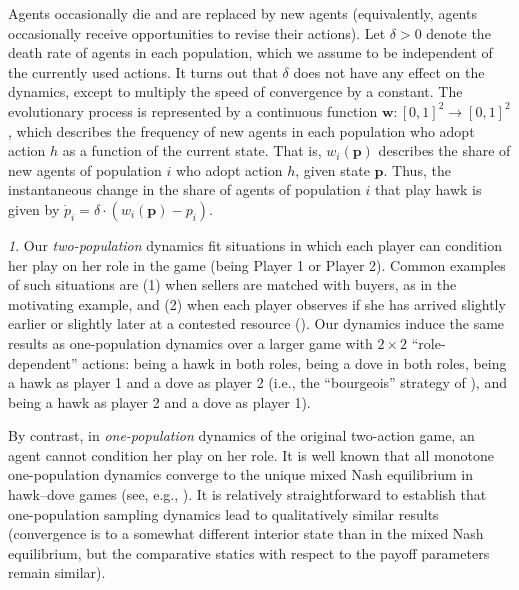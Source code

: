 \documentclass[12pt]{article}
\numberwithin{equation}{section}
\numberwithin{figure}{section}
\theoremstyle{definition}
\theoremstyle{plain}
\theoremstyle{plain}
\theoremstyle{plain}
\theoremstyle{remark}
\newtheorem{rem}{\protect\remarkname}
\theoremstyle{plain}
\theoremstyle{plain}
\providecommand{\remarkname}{Remark}
\begin{document}
Agents occasionally die and are replaced by new agents (equivalently,
agents occasionally receive opportunities
to revise their actions).
Let $\delta>0$ denote the death rate
of agents in each population, which we assume to be independent of
the currently used actions. It turns out that $\delta$ does not have any effect on the dynamics,
except to multiply the speed of convergence by a constant. 
The evolutionary process is represented by a continuous function
$\textbf{w}:\left[0,1\right]^{2}\rightarrow\left[0,1\right]^{2}$, which describes
the frequency of new agents in each population who adopt action $h$ as a function of the current state. That is, $w_{i}\left(\mathbf{p}\right)$
describes the share of new agents of population $i$ who adopt action
$h$, given state $\mathbf{p}$. 
Thus, the instantaneous change in the share of agents of population $i$ that play hawk is given by 
$\dot{p}_{i}=\delta\cdot\left(w_{i}\left(\mathbf{p}\right)-p_{i}\right).\label{eq:general-dyanmics}$

\begin{rem}\label{rem-two-one}
Our \emph{two-population} dynamics fit situations in which each player can condition
her play on her role in the game (being Player 1 or Player 2). Common examples of such situations are (1) when sellers are matched with buyers, as in the motivating example, and (2) when each player observes if she has arrived slightly earlier or slightly later at a contested resource (\citealp{smith1982evolution}).
Our dynamics induce the same results as one-population dynamics over a larger game with  $2\times2$ “role-dependent” actions: being a hawk in both roles, being a dove in both roles, being a hawk as player 1 and a dove as player 2 (i.e., the “bourgeois” strategy of \citealp{smith1982evolution}), and being a hawk as player 2 and a dove as player 1).

By contrast, in \emph{one-population} dynamics 
of the original two-action game, an agent cannot condition her play on her role. It is well known that all monotone one-population dynamics converge to the unique mixed Nash equilibrium in hawk--dove games 
(see, e.g., \citealp[Section 4.3.2]{weibull1997evolutionary}). It is relatively straightforward to establish that one-population sampling dynamics lead to qualitatively similar results (convergence is to a somewhat different interior state than in
the mixed Nash equilibrium, but the comparative statics with respect to the payoff parameters remain similar).
\end{rem}
\end{document}
